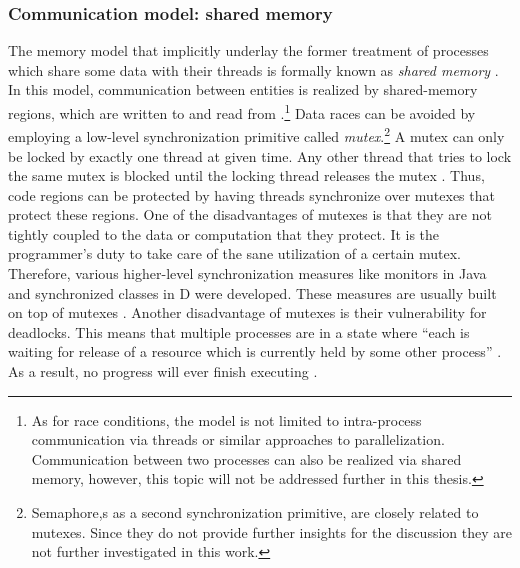 \subsubsection{Communication model: shared memory}
The memory model that implicitly underlay the former treatment of processes which share some data with their threads is formally known as \textit{shared memory} . In this model, communication between entities is realized by shared-memory regions, which are written to and read from \cite[p.~138]{OperatingSystems_by_Haldar}.\footnote{As for race conditions, the model is not limited to intra-process communication via threads or similar approaches to parallelization. Communication between two processes can also be realized via shared memory, however, this topic will not be addressed further in this thesis.} Data races can be avoided by employing a low-level synchronization primitive called \textit{mutex}.\footnote{Semaphore,s as a second synchronization primitive, are closely related to mutexes. Since they do not provide further insights for the discussion they are not further investigated in this work.} A mutex can only be locked by exactly one thread at given time. Any other thread that tries to lock the same mutex is blocked until the locking thread releases the mutex \cite{AdvancedLinuxProgramming}. Thus, code regions can be protected by having threads synchronize over mutexes that protect these regions. One of the disadvantages of mutexes is that they are not tightly coupled to the data or computation that they protect. It is the programmer's duty to take care of the sane utilization of a certain mutex. Therefore, various higher-level synchronization measures like monitors in Java \cite[p.~42]{ConcurrentAndDistributedComputingInJava} and synchronized classes in D \cite{TheDProgrammingLanguage} were developed. These measures are usually built on top of mutexes \cite[p.~25]{TamingJavaThreads}. Another disadvantage of mutexes is their vulnerability for deadlocks. This means that multiple processes are in a state where ``each is waiting for release of a resource which is currently held by some other process'' \cite[p.~119]{IntroductionToOperatingSystems}. As a result, no progress will ever finish executing \cite[p.~2-3]{OperatingSystems_by_Dhotre}.

